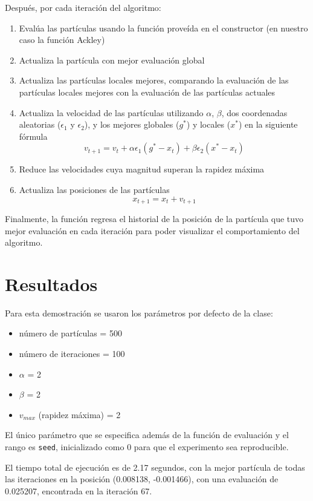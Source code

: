 \documentclass[sigconf,authorversion,nonacm]{acmart}
\begin{document}
Después, por cada iteración del algoritmo:
\begin{enumerate}
  \item Evalúa las partículas usando la función proveída en el constructor (en nuestro caso la función Ackley)
  \item Actualiza la partícula con mejor evaluación global
  \item Actualiza las partículas locales mejores, comparando la evaluación de las partículas locales mejores con la evaluación de las partículas actuales
  \item Actualiza la velocidad de las partículas utilizando $\alpha$, $\beta$, dos coordenadas aleatorias ($\epsilon_1$ y $\epsilon_2$), y los mejores globales ($g^*$) y locales ($x^*$) en la siguiente fórmula
  $$v_{t+1} = v_t + \alpha \epsilon_1 (g^* - x_t) + \beta \epsilon_2 (x^* - x_t)$$
  \item Reduce las velocidades cuya magnitud superan la rapidez máxima
  \item Actualiza las posiciones de las partículas
  $$x_{t+1} = x_t + v_{t+1}$$
\end{enumerate}

Finalmente, la función regresa el historial de la posición de la partícula que tuvo mejor evaluación en cada iteración para poder visualizar el comportamiento del algoritmo.

\section{Resultados}
Para esta demostración se usaron los parámetros por defecto de la clase:
\begin{itemize}
  \item número de partículas = 500
  \item número de iteraciones = 100
  \item $\alpha$ = 2
  \item $\beta$ = 2
  \item $v_{max}$ (rapidez máxima) = 2
\end{itemize}

El único parámetro que se especifica además de la función de evaluación y el rango es \texttt{seed}, inicializado como 0 para que el experimento sea reproducible.

El tiempo total de ejecución es de 2.17 segundos, con la mejor partícula de todas las iteraciones en la posición (0.008138, -0.001466), con una evaluación de 0.025207, encontrada en la iteración 67.
\end{document}
